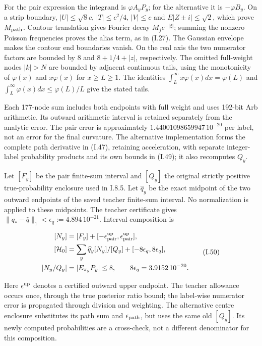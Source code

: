 \documentclass{article}
\begin{document}
For the pair expression the integrand is \(\varphi A_yP_y\); for the
alternative it is \(-\varphi B_y\). On a strip boundary,
\(|U|\le\sqrt8c\), \(|T|\le c^2/4\), \(|V|\le c\) and
\(E|Z\pm i|\le\sqrt2\), which prove \(M_{\rm path}\). Contour
translation gives Fourier decay \(M_j e^{-|\xi|}\); summing the nonzero
Poisson frequencies proves the alias term, as in (I.27). The Gaussian
envelope makes the contour end boundaries vanish. On the real axis the
two numerator factors are bounded by \(8\) and \(8+1/4+|z|\),
respectively. The omitted full-weight nodes \(|k|>N\) are bounded by
adjacent continuous tails, using the monotonicity of \(\varphi(x)\) and
\(x\varphi(x)\) for \(x\ge L\ge1\). The identities
\(\int_L^\infty x\varphi(x)dx=\varphi(L)\) and
\(\int_L^\infty\varphi(x)dx\le\varphi(L)/L\) give the stated tails.

Each 177-node sum includes both endpoints with full weight and uses
192-bit Arb arithmetic. Its outward arithmetic interval is retained
separately from the analytic error. The pair error is approximately
\(1.44001098659947\,10^{-20}\) per label, not an error for the final
curvature. The alternative implementation forms the complete path
derivative in (I.47), retaining acceleration, with separate
integer-label probability products and its own bounds in (I.49); it also
recomputes \(Q_y\).

Let \([F_y]\) be the pair finite-sum interval and \([Q_y]\) the original
strictly positive true-probability enclosure used in I.8.5. Let
\(\widehat q_y\) be the exact midpoint of the two outward endpoints of
the saved teacher finite-sum interval. No normalization is applied to
these midpoints. The teacher certificate gives
\(\|q_*-\widehat q\|_1<\epsilon_q:=4.894\,10^{-21}\). Interval
composition is

\[
\begin{aligned}
[N_y]&=[F_y]+[-\epsilon_{\rm pair}^{\rm up},\epsilon_{\rm pair}^{\rm up}],\\
[\mathcal H_0]&=\sum_y\widehat q_y[N_y]/[Q_y]+[-8\epsilon_q,8\epsilon_q],\\
|N_y/Q_y|&=|E_{\pi_y}P_y|\le8,\qquad
8\epsilon_q=3.9152\,10^{-20}.
\end{aligned}
\tag{I.50}
\]

Here \(\epsilon^{\rm up}\) denotes a certified outward upper endpoint.
The teacher allowance occurs once, through the true posterior ratio
bound; the label-wise numerator error is propagated through division and
weighting. The alternative centre enclosure substitutes its path sum and
\(\epsilon_{\rm path}\), but uses the same old \([Q_y]\). Its newly
computed probabilities are a cross-check, not a different denominator
for this composition.
\end{document}
